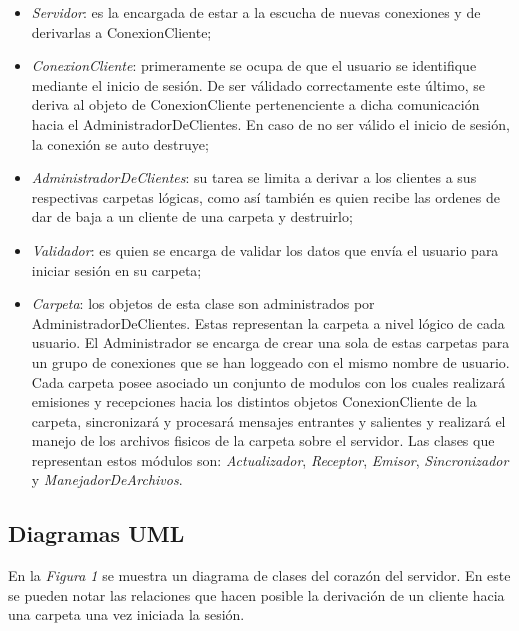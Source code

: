\documentclass{article}
\begin{document}
	\begin{itemize}
	\itemsep=5pt \topsep=0pt \partopsep=0pt \parskip=0pt \parsep=0pt

		\item \textit{Servidor}: es la encargada de estar a la escucha de nuevas conexiones y de derivarlas a ConexionCliente;

		\item \textit{ConexionCliente}: primeramente se ocupa de que el usuario se identifique mediante el inicio de sesión. De ser válidado correctamente este último, se deriva al objeto de ConexionCliente pertenenciente a dicha comunicación hacia el AdministradorDeClientes. En caso de no ser válido el inicio de sesión, la conexión se auto destruye;

		\item \textit{AdministradorDeClientes}: su tarea se limita a derivar a los clientes a sus respectivas carpetas lógicas, como así también es quien recibe las ordenes de dar de baja a un cliente de una carpeta y destruirlo;

		\item \textit{Validador}: es quien se encarga de validar los datos que envía el usuario para iniciar sesión en su carpeta;

		\item \textit{Carpeta}: los objetos de esta clase son administrados por AdministradorDeClientes. Estas representan la carpeta a nivel lógico de cada usuario. El Administrador se encarga de crear una sola de estas carpetas para un grupo de conexiones que se han loggeado con el mismo nombre de usuario. Cada carpeta posee asociado un conjunto de modulos con los cuales realizará emisiones y recepciones hacia los distintos objetos ConexionCliente de la carpeta, sincronizará y procesará mensajes entrantes y salientes y realizará el manejo de los archivos fisicos de la carpeta sobre el servidor. Las clases que representan estos módulos son: \textit{Actualizador}, \textit{Receptor}, \textit{Emisor}, \textit{Sincronizador} y \textit{ManejadorDeArchivos}.

	\end{itemize}

\bigskip



\subsection{Diagramas UML}

	En la \textit{Figura 1} se muestra un diagrama de clases del corazón del servidor. En este se pueden notar las relaciones que hacen posible la derivación de un cliente hacia una carpeta una vez iniciada la sesión.
	
\end{document}

